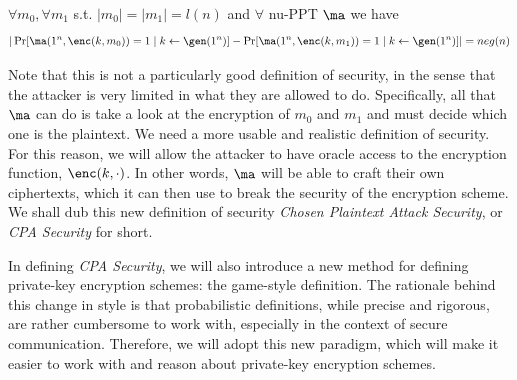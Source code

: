 \begin{definition}
    $\forall m_0, \forall m_1$ s.t. $|m_0| = |m_1|= l(n)$ and $\forall$ nu-PPT $\ma$ we have
    $$|\Pr[\ma(1^n, \enc(k, m_0)) = 1 \; | \; k \leftarrow \gen(1^n)] - \Pr[\ma(1^n, \enc(k, m_1)) = 1 \; | \; k \leftarrow \gen(1^n)]| = neg(n)$$
\end{definition}
Note that this is not a particularly good definition of security, in the sense that the attacker is very limited in what they are allowed to do.
Specifically, all that $\ma$ can do is take a look at the encryption of $m_0$ and $m_1$ and must decide which one is the plaintext.
We need a more usable and realistic definition of security.
For this reason, we will allow the attacker to have oracle access to the encryption function, $\enc(k, \cdot)$.
In other words, $\ma$ will be able to craft their own ciphertexts, which it can then use to break the security of the encryption scheme.
We shall dub this new definition of security \textit{Chosen Plaintext Attack Security}, or \textit{CPA Security} for short.


In defining \textit{CPA Security}, we will also introduce a new method for defining private-key encryption schemes: the game-style definition.
The rationale behind this change in style is that probabilistic definitions, while precise and rigorous, are rather cumbersome to work with, especially in the context of secure communication.
Therefore, we will adopt this new paradigm, which will make it easier to work with and reason about private-key encryption schemes.


